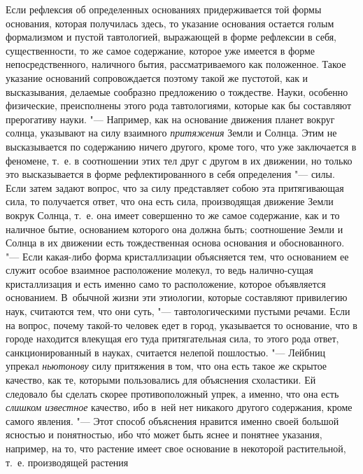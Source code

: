 Если рефлексия об определенных основаниях придерживается той формы основания,
которая получилась здесь, то указание основания остается голым формализмом и
пустой тавтологией, выражающей в форме рефлексии в себя, существенности, то же
самое содержание, которое уже имеется в форме непосредственного, наличного
бытия, рассматриваемого как положенное. Такое указание оснований сопровождается
поэтому такой же пустотой, как и высказывания, делаемые сообразно предложению о
тождестве. Науки, особенно физические, преисполнены этого рода тавтологиями,
которые как бы составляют прерогативу науки. "--- Например, как на основание
движения планет вокруг солнца, указывают на силу взаимного {\em притяжения}
Земли и Солнца. Этим не высказывается по содержанию ничего другого, кроме того,
что уже заключается в феномене, т.~е. в соотношении этих тел друг с другом в их
движении, но только это высказывается в форме рефлектированного в себя
определения "--- силы. Если затем задают вопрос, что за силу представляет собою
эта притягивающая сила, то получается ответ, что она есть сила, производящая
движение Земли вокрук Солнца, т.~е. она имеет совершенно то же самое
содержание, как и то наличное бытие, основанием которого она должна быть;
соотношение Земли и Солнца в их движении есть тождественная основа основания и
обоснованного. "--- Если какая-либо форма кристаллизации объясняется тем, что
основанием ее служит особое взаимное расположение молекул, то ведь
налично-сущая кристаллизация и есть именно само то расположение, которое
объявляется основанием. В~обычной жизни эти этиологии, которые составляют привилегию наук, считаются тем, что они суть,
"--- тавтологическими пустыми речами. Если на вопрос, почему такой-то человек
едет в город, указывается то основание, что в городе находится влекущая его
туда притягательная сила, то этого рода ответ, санкционированный в науках,
считается нелепой пошлостью. "--- Лейбниц упрекал {\em ньютонову} силу
притяжения в том, что она есть такое же скрытое качество, как те, которыми
пользовались для объяснения схоластики. Ей следовало бы сделать скорее
противоположный упрек, а именно, что она есть {\em слишком известное} качество,
ибо в~ней нет никакого другого содержания, кроме самого явления. "--- Этот
способ объяснения нравится именно своей большой ясностью и понятностью, ибо
чт\'{о} может быть яснее и понятнее указания, например, на то, что растение
имеет свое основание в некоторой растительной, т.~е. производящей растения
